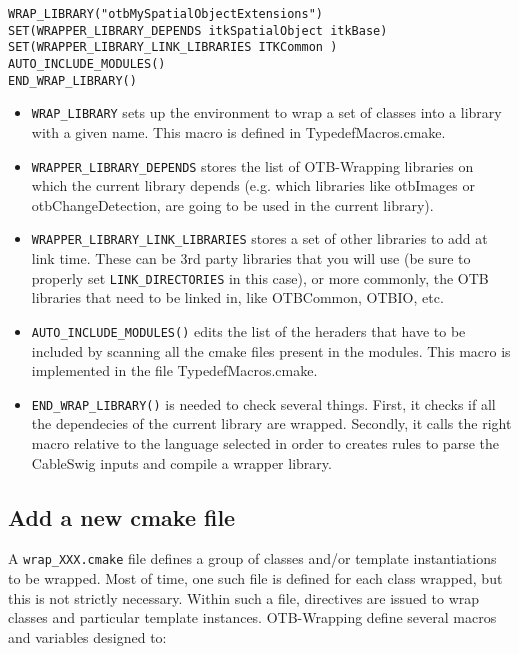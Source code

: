 \verb$WRAP_LIBRARY("otbMySpatialObjectExtensions")$ \\
\verb$SET(WRAPPER_LIBRARY_DEPENDS itkSpatialObject itkBase)$ \\
\verb$SET(WRAPPER_LIBRARY_LINK_LIBRARIES ITKCommon )$ \\
\verb$AUTO_INCLUDE_MODULES()$ \\
\verb$END_WRAP_LIBRARY()$ \\

\begin{itemize}
\item	\verb$WRAP_LIBRARY$  sets up the environment to wrap a set of classes into a 
library with a given name. This macro is defined in TypedefMacros.cmake. 

\item	\verb$WRAPPER_LIBRARY_DEPENDS$ stores the list of OTB-Wrapping libraries on which the current library depends 
(e.g. which libraries like otbImages or otbChangeDetection, are going to be used in the current library). 

\item	\verb$WRAPPER_LIBRARY_LINK_LIBRARIES$ stores a set of other libraries to add at link time. 
These can be 3rd party libraries that you will use 
(be sure to properly set \verb$LINK_DIRECTORIES$ in this case), 
or more commonly, the OTB libraries that need to 
be linked in, like OTBCommon, OTBIO, etc.

\item	\verb$AUTO_INCLUDE_MODULES()$  edits the list of the heraders that have to 
be included by scanning all the cmake files present in the modules. This macro is implemented in the 
file TypedefMacros.cmake.

\item \verb$END_WRAP_LIBRARY()$ is needed to check several things. First, it checks if all the dependecies 
of the current library are wrapped. Secondly, it calls the right macro relative to the language selected in 
order to creates rules to parse the CableSwig inputs and compile a wrapper library. 
\end{itemize}

\subsection{Add a new cmake file}
A \verb$wrap_XXX.cmake$ file defines a group of classes and/or template instantiations to be wrapped. 
Most of time, one such file is defined for each class wrapped, but this is not strictly necessary. 
Within such a file, directives are issued to wrap classes and particular template instances.
OTB-Wrapping define several macros and variables designed to:

